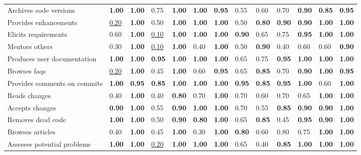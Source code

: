 \begin{tabular}{lllllllllllll}
Archives code versions & \textbf{1.00} & \textbf{1.00} & 0.75 & \textbf{1.00} & \textbf{1.00} & \textbf{0.95} & 0.55 & 0.60 & 0.70 & \textbf{0.90} & \textbf{0.85} & \textbf{0.95} \\
Provides enhancements & \underline{0.20} & \textbf{1.00} & 0.50 & \textbf{1.00} & \textbf{1.00} & \textbf{1.00} & 0.50 & \textbf{0.80} & \textbf{0.90} & \textbf{0.90} & \textbf{1.00} & \textbf{1.00} \\
Elicits requirements & 0.60 & \textbf{1.00} & \underline{0.10} & \textbf{1.00} & \textbf{1.00} & \textbf{1.00} & \textbf{0.90} & 0.65 & 0.75 & \textbf{0.95} & \textbf{1.00} & \textbf{1.00} \\
Mentors others & 0.30 & \textbf{1.00} & \underline{0.10} & \textbf{1.00} & 0.40 & \textbf{1.00} & 0.50 & \textbf{0.90} & 0.40 & 0.60 & 0.60 & \textbf{0.90} \\
Produces user documentation & \textbf{1.00} & \textbf{1.00} & \textbf{0.95} & \textbf{1.00} & \textbf{1.00} & \textbf{1.00} & 0.65 & 0.75 & \textbf{0.95} & \textbf{1.00} & \textbf{1.00} & \textbf{1.00} \\
Browses faqs & \underline{0.20} & \textbf{1.00} & 0.45 & \textbf{1.00} & 0.60 & \textbf{0.95} & 0.65 & \textbf{0.85} & 0.70 & \textbf{0.90} & \textbf{1.00} & \textbf{0.95} \\
Provides comments on commits & \textbf{1.00} & \textbf{0.95} & \textbf{0.85} & \textbf{1.00} & \textbf{1.00} & \textbf{1.00} & \textbf{0.95} & \textbf{0.85} & \textbf{0.95} & \textbf{1.00} & 0.60 & \textbf{1.00} \\
Reads changes & 0.40 & \textbf{1.00} & 0.40 & \textbf{0.80} & 0.70 & \textbf{1.00} & 0.70 & 0.60 & 0.70 & 0.65 & \textbf{1.00} & \textbf{1.00} \\
Accepts changes & \textbf{0.90} & \textbf{1.00} & 0.55 & \textbf{0.90} & \textbf{1.00} & \textbf{1.00} & 0.70 & 0.55 & \textbf{0.85} & \textbf{0.90} & \textbf{0.90} & \textbf{1.00} \\
Removes dead code & \textbf{1.00} & \textbf{1.00} & 0.50 & \textbf{0.90} & \textbf{0.80} & \textbf{1.00} & 0.65 & \textbf{0.85} & 0.45 & \textbf{0.95} & \textbf{0.90} & \textbf{1.00} \\
Browses articles & 0.40 & \textbf{1.00} & 0.45 & \textbf{1.00} & 0.30 & \textbf{1.00} & \textbf{0.80} & 0.60 & 0.80 & 0.75 & \textbf{1.00} & \textbf{1.00} \\
Assesses potential problems & \textbf{1.00} & \textbf{1.00} & \underline{0.20} & \textbf{1.00} & \textbf{1.00} & \textbf{1.00} & 0.65 & 0.40 & \textbf{0.85} & \textbf{1.00} & \textbf{1.00} & \textbf{1.00} \\

\end{tabular}
